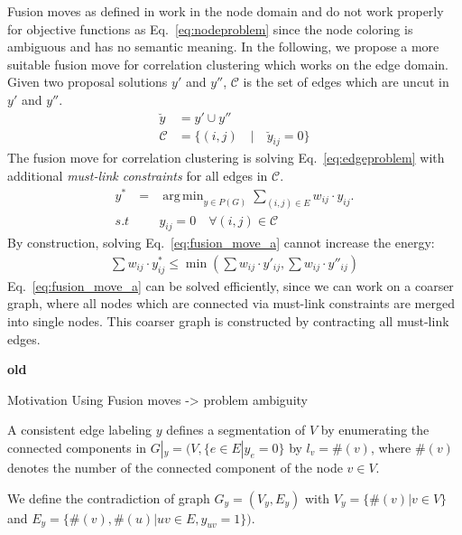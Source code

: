 \documentclass[10pt,twocolumn,letterpaper]{article}
\DeclareMathOperator*{\argmin}{arg\,min}
\begin{document}
Fusion moves as defined in \cite{Lempitsky-2010} work
in the node domain and do not work properly for 
objective functions as Eq.~\ref{eq:nodeproblem} since
the node coloring is ambiguous and has no semantic meaning.
In the following, we propose a more suitable fusion move for correlation
clustering which works on the edge domain.
%
Given two proposal solutions $y'$ and $y''$,
$\mathcal{C}$ is the set of edges
which are uncut in $y'$ and $y''$.
%
\begin{align}
\breve{y}    & =  y' \cup y'' \\
\mathcal{C}  & =  \{ (i, j) \quad | \quad \breve{y}_{ij} = 0 \}
\end{align}
%
The fusion move for correlation clustering is solving Eq.~\ref{eq:edgeproblem}
with additional \emph{must-link constraints} for all edges in $\mathcal{C}$.
%
\begin{align}
  y^* &=& \argmin_{y \in P(G)} \sum_{ (i,j) \in E } w_{ij} \cdot y_{ij} \label{eq:fusion_move_a}.\\ 
  s.t & &  y_{ij} = 0 \quad \forall (i, j) \in \mathcal{C} \nonumber
\end{align}
%
By construction, solving Eq.~\ref{eq:fusion_move_a} cannot increase the energy:
\begin{align}
  \sum  w_{ij} \cdot y^*_{ij}  \leq \min \left( \sum  w_{ij} \cdot y'_{ij} ,  \sum   w_{ij} \cdot y''_{ij} \right)
\end{align}
%
Eq.~\ref{eq:fusion_move_a} can be solved efficiently, since 
we can work on a coarser graph, where all nodes which are connected
via must-link constraints are merged into single nodes.
This coarser graph is constructed by contracting all must-link edges.




\textbf{old}

Motivation Using Fusion moves -> problem ambiguity

A consistent edge labeling $y$ defines a segmentation of $V$ by enumerating the connected components 
in $G|_y=(V,\{e\in E|y_e=0\}$ by $l_v = \#(v)$, where $\#(v)$ denotes the number of the connected component of the node $v\in V$.

We define the contradiction of graph $G_y=(V_y,E_y)$
with $V_y=\{\#(v)|v\in V\}$ and $E_y=\{\#(v),\#(u)|uv\in E, y_{uv}=1\})$.

%



\end{document}
